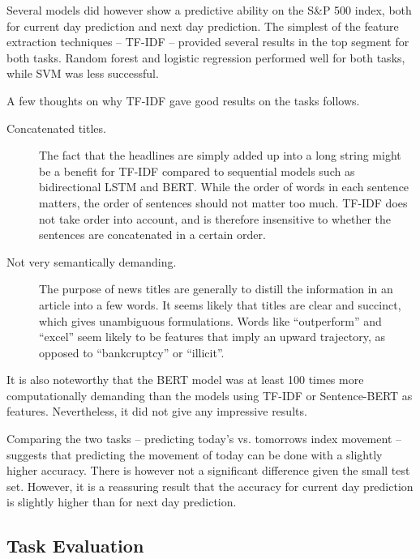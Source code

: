 Several models did however show a predictive ability on the S\&P 500 index, both for current day prediction and next day prediction. The simplest of the feature extraction techniques -- TF-IDF -- provided several results in the top segment for both tasks. Random forest and logistic regression performed well for both tasks, while SVM was less successful.

A few thoughts on why TF-IDF gave good results on the tasks follows. 
\begin{description}
    \item[Concatenated titles.] The fact that the headlines are simply added up into a long string might be a benefit for TF-IDF compared to sequential models such as bidirectional LSTM and BERT. While the order of words in each sentence matters, the order of sentences should not matter too much. TF-IDF does not take order into account, and is therefore insensitive to whether the sentences are concatenated in a certain order. 
    \item[Not very semantically demanding. ] The purpose of news titles are generally to distill the information in an article into a few words. It seems likely that titles are clear and succinct, which gives unambiguous formulations. Words like ``outperform'' and ``excel'' seem likely to be features that imply an upward trajectory, as opposed to ``bankcruptcy'' or ``illicit''. 
\end{description}

It is also noteworthy that the BERT model was at least 100 times more computationally demanding than the models using TF-IDF or Sentence-BERT as features. Nevertheless, it did not give any impressive results. 

Comparing the two tasks -- predicting today's vs. tomorrows index movement -- suggests that predicting the movement of today can be done with a slightly higher accuracy. There is however not a significant difference given the small test set. However, it is a reassuring result that the accuracy for current day prediction is slightly higher than for next day prediction. 

\subsection{Task Evaluation}

